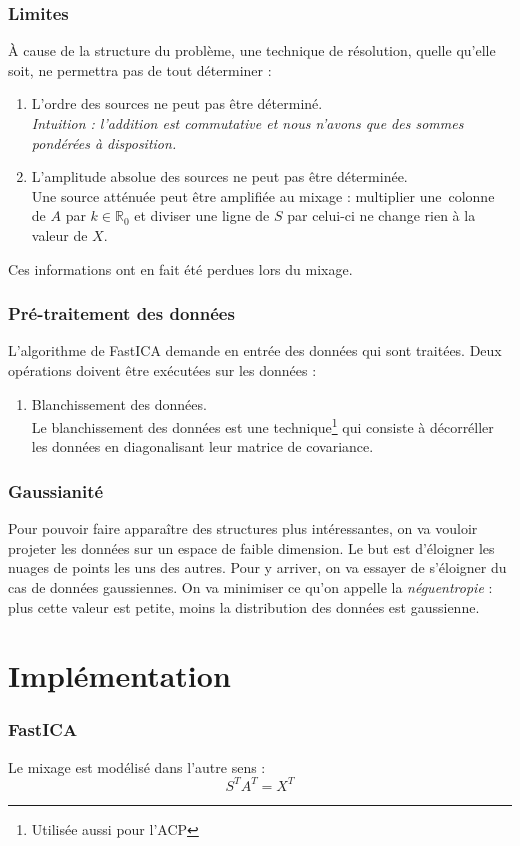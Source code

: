 \documentclass[compress]{beamer}
\newcommand{\esR}{\mathbb{R}}
\begin{document}
\begin{frame}
	\frametitle{Limites}
	À cause de la structure du problème, une technique de résolution,
	quelle qu'elle soit, ne permettra pas de tout déterminer :
	\pause
	\begin{enumerate}
	\item L'ordre des sources ne peut pas être déterminé.
	\pause
		\\\textit{Intuition : l'addition est commutative et nous n'avons que
			des sommes pondérées à disposition.}
	\pause
	\item L'amplitude absolue des sources ne peut pas être déterminée.
	\pause
		\\Une source atténuée peut être amplifiée au mixage :
			multiplier une~colonne de $A$ par $k\in\esR_0$ et
			diviser une ligne de $S$ par celui-ci ne change rien à
			la valeur de $X$.
	\pause
	\end{enumerate}

	Ces informations ont en fait été perdues lors du mixage.
\end{frame}
\begin{frame}
	\frametitle{Pré-traitement des données}
	L'algorithme de FastICA demande en entrée des données qui sont traitées.
	Deux opérations doivent être exécutées sur les données :
	\pause
	\begin{enumerate}
	\item Blanchissement des données.
		\pause
			\\Le blanchissement des données est une
			technique\footnote{Utilisée aussi pour l'ACP}
			qui consiste à décorréller les données en diagonalisant
			leur matrice de covariance.
	\pause
	
	\end{enumerate}
\end{frame}
\begin{frame}
	\frametitle{Gaussianité}
	Pour pouvoir faire apparaître des structures plus intéressantes,
	on va vouloir projeter les données sur un espace de faible dimension.
	Le but est d'éloigner les nuages de points les uns des autres.
	Pour y arriver, on va essayer de s'éloigner du cas de données gaussiennes.
	On va minimiser ce qu'on appelle la \textit{néguentropie} :
	plus cette valeur est petite, moins la distribution des données
	est gaussienne.
\end{frame}


\section{Implémentation}
\begin{frame}
	\frametitle{FastICA}
	Le mixage est modélisé dans l'autre sens :
	\[
		S^TA^T=X^T
	\]
\end{frame}
\end{document}
